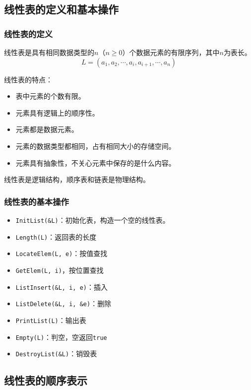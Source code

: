 \documentclass[12pt, a4paper, oneside]{ctexart}
\begin{document}
\subsection{线性表的定义和基本操作}

\subsubsection{线性表的定义}

线性表是具有相同数据类型的$n$（$n\geq 0$）个数据元素的有限序列，其中$n$为表长。
\begin{equation*}
  L=(a_1,a_2,\cdots,a_i,a_{i+1},\cdots,a_n)
\end{equation*}

线性表的特点：
\begin{itemize}
  \item 表中元素的个数有限。
  \item 元素具有逻辑上的顺序性。
  \item 元素都是数据元素。
  \item 元素的数据类型都相同，占有相同大小的存储空间。
  \item 元素具有抽象性，不关心元素中保存的是什么内容。
\end{itemize}

线性表是逻辑结构，顺序表和链表是物理结构。

\subsubsection{线性表的基本操作}

\begin{itemize}
  \item \verb|InitList(&L)|：初始化表，构造一个空的线性表。
  \item \verb|Length(L)|：返回表的长度
  \item \verb|LocateElem(L, e)|：按值查找
  \item \verb|GetElem(L, i)|，按位置查找
  \item \verb|ListInsert(&L, i, e)|：插入
  \item \verb|ListDelete(&L, i, &e)|：删除
  \item \verb|PrintList(L)|：输出表
  \item \verb|Empty(L)|：判空，空返回\verb|true|
  \item \verb|DestroyList(&L)|：销毁表
\end{itemize}

\subsection{线性表的顺序表示}
\end{document}
